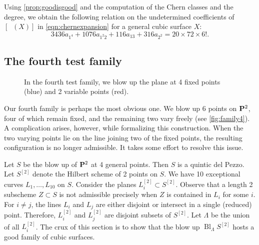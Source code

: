 \documentclass[12pt,reqno]{amsart}
\DeclareMathOperator{\Bl}{Bl}
\DeclareMathOperator{\Orb}{\overline{Orb}}
\numberwithin{equation}{section}
\begin{document}
Using \autoref{prop:goodisgood} and the computation of the Chern classes and the degree, we obtain the following relation on the undetermined coefficients of $[\Orb(X)]$ in
\eqref{eqn:chernexpansion} for a general cubic surface $X$:
\begin{equation}
  \label{eq:relation3}
  3436a_{1^4} + 1076a_{1^{2}2} + 116 a_{13} + 316 a_{2^{2}} = 20 \times 72 \times 6!.
\end{equation}



\subsection{The fourth test family}
\label{sec:family-b_4}
\begin{figure}
    \centering
    
    \caption{In the fourth test family, we blow up the plane at 4 fixed points (blue) and 2 variable points (red).}
    \label{fig:family4}
  \end{figure}
Our fourth family is perhaps the most obvious one.
We blow up 6 points on $\P^2$, four of which remain fixed, and the remaining two vary freely (see \autoref{fig:family4}).
A complication arises, however, while formalizing this construction.
When the two varying points lie on the line joining two of the fixed points, the resulting configuration is no longer admissible.
It takes some effort to resolve this issue.

Let $S$ be the blow up of $\P^2$ at 4 general points.
Then $S$ is a quintic del Pezzo. 
Let $S^{[2]}$ denote the Hilbert scheme of 2 points on $S$.
We have 10 exceptional curves $L_1, \dots, L_{10}$ on $S$.
Consider the planes $L^{[2]}_i \subset S^{[2]}$.
Observe that a length 2 subscheme $Z \subset S$ is not admissible precisely when $Z$ is contained in $L_i$ for some $i$.
For $i \neq j$, the lines $L_i$ and $L_j$ are either disjoint or intersect in a single (reduced) point.
Therefore, $L^{[2]}_i$ and  $L^{[2]}_j$ are disjoint subsets of $S^{[2]}$.
Let $\Lambda$ be the union of all $L^{[2]}_i$.
The crux of this
section is to show that the blow up $\Bl_{\Lambda}S^{[2]}$ hosts a
good family of cubic surfaces.
\end{document}
